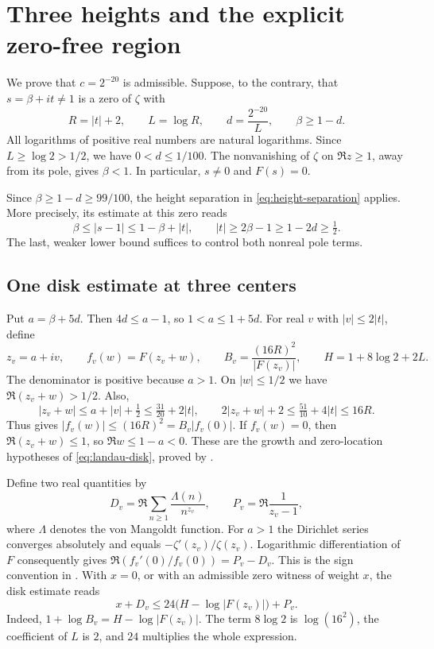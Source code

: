 \section{Three heights and the explicit zero-free region}
\label{sec:three-heights}

We prove that \(c=2^{-20}\) is admissible. Suppose, to the contrary, that
\(s=\beta+it\ne1\) is a zero of \(\zeta\) with
\[
  R=|t|+2,\qquad L=\log R,\qquad d=\frac{2^{-20}}{L},
  \qquad \beta\ge 1-d .
\]
All logarithms of positive real numbers are natural logarithms.
Since \(L\ge\log 2>1/2\), we have \(0<d\le 1/100\).
The nonvanishing of \(\zeta\) on \(\Re z\ge 1\), away from its pole,
gives \(\beta<1\). In particular, \(s\ne0\) and \(F(s)=0\).

Since \(\beta\ge1-d\ge 99/100\), the height separation
in \eqref{eq:height-separation} applies. More precisely, its estimate at
this zero reads
\[
    \beta\le |s-1|\le 1-\beta+|t|,
    \qquad |t|\ge 2\beta-1\ge 1-2d\ge \tfrac12 .
\]
The last, weaker lower bound suffices to control both nonreal pole terms.

\subsection{One disk estimate at three centers}

Put \(a=\beta+5d\). Then \(4d\le a-1\), so \(1<a\le 1+5d\).
For real \(v\) with \(|v|\le 2|t|\), define
\[
 z_v=a+iv,\qquad f_v(w)=F(z_v+w),\qquad
 B_v=\frac{(16R)^2}{|F(z_v)|},\qquad
 H=1+8\log 2+2L .
\]
The denominator is positive because \(a>1\).
On \(|w|\le 1/2\) we have \(\Re(z_v+w)>1/2\). Also,
\[
   |z_v+w|\le a+|v|+\tfrac12\le \tfrac{31}{20}+2|t|,
   \qquad 2|z_v+w|+2\le \tfrac{51}{10}+4|t|\le 16R .
\]
Thus  gives
\(|f_v(w)|\le(16R)^2=B_v|f_v(0)|\).
If \(f_v(w)=0\), then \(\Re(z_v+w)\le1\), so \(\Re w\le1-a<0\).
These are the growth and zero-location hypotheses of \eqref{eq:landau-disk},
proved by .

Define two real quantities by
\[
   D_v=\Re\sum_{n\ge 1}\frac{\Lambda(n)}{n^{z_v}},
   \qquad P_v=\Re\frac{1}{z_v-1},
\]
where \(\Lambda\) denotes the von Mangoldt function. For \(a>1\) the
Dirichlet series converges absolutely and equals \(-\zeta'(z_v)/\zeta(z_v)\).
Logarithmic differentiation of \(F\) consequently gives
\(\Re(f_v'(0)/f_v(0))=P_v-D_v\).
This is the sign convention in . With \(x=0\),
or with an admissible zero witness of weight \(x\), the disk estimate reads
\begin{equation}
   x+D_v\le 24\bigl(H-\log|F(z_v)|\bigr)+P_v .
   \label{eq:three-window}
\end{equation}
Indeed, \(1+\log B_v=H-\log|F(z_v)|\). The term \(8\log 2\) is
\(\log(16^2)\), the coefficient of \(L\) is \(2\), and \(24\) multiplies
the whole expression.

